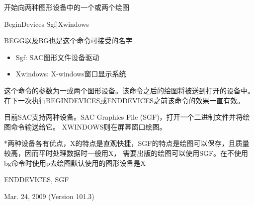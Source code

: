 \label{cmd:begindevices}

开始向两种图形设备中的一个或两个绘图

BeginDevices Sgf|Xwindows

BEGG以及BG也是这个命令可接受的名字

\begin{itemize}
\item Sgf: SAC图形文件设备驱动
\item Xwindows: X-windows窗口显示系统
\end{itemize}

这个命令的参数为一或两个图形设备。该命令之后的绘图将被送到打开的设备中。在下一次执行BEGINDEVICES或ENDDEVICES之前该命令的效果一直有效。

目前SAC支持两种设备。SAC Graphics File (SGF)，打开一个二进制文件并将绘图命令输送给它。
XWINDOWS则在屏幕窗口绘图。

*两种设备各有优点，X的特点是直观快捷，SGF的特点是绘图可以保存，且质量较高，因而平时处理数据时一般用X，
需要出版的绘图可以使用SGF。在不使用bg命令时使用p去绘图默认使用的图形设备是X

ENDDEVICES, SGF

Mar. 24, 2009 (Version 101.3)
